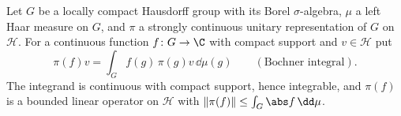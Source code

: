 Let $G$ be a locally compact Hausdorff group with its Borel $\sigma$-algebra, $\mu$ a left Haar measure on $G$, and
$\pi$ a strongly continuous unitary representation of $G$ on $\mathcal H$. For a continuous function $f\colon G\to\C$
with compact support and $v\in\mathcal H$ put
\[
  \pi(f)v=\int_Gf(g)\,\pi(g)v\,\dd\mu(g)\qquad(\text{Bochner integral}).
\]
The integrand is continuous with compact support, hence integrable, and $\pi(f)$ is a bounded linear operator on
$\mathcal H$ with $\lVert\pi(f)\rVert\le\int_G\abs f\,\dd\mu$.
